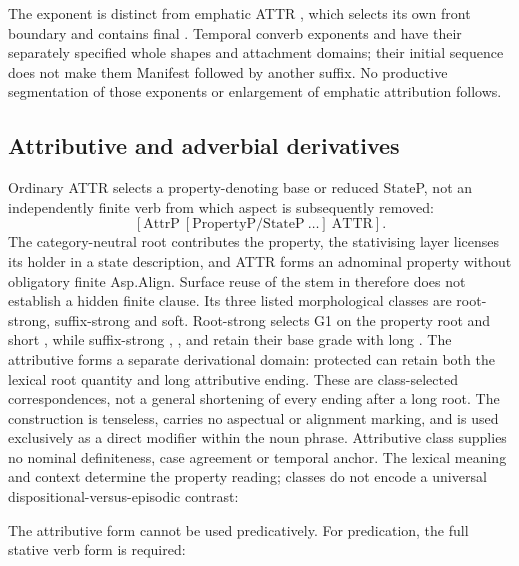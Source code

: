 The exponent is distinct from emphatic ATTR , which selects
its own front boundary and contains final . Temporal converb
exponents  and  have their separately specified
whole shapes and attachment domains; their initial sequence does not make
them Manifest followed by another suffix. No productive segmentation of
those exponents or enlargement of emphatic attribution follows.

\subsection{Attributive and adverbial derivatives}\label{sec:stative-attr}

Ordinary ATTR selects a property-denoting base or reduced StateP, not an
independently finite verb from which aspect is subsequently removed:
\[
[\mathrm{AttrP}\ [\mathrm{PropertyP}/\mathrm{StateP}\ \ldots]\ \mathrm{ATTR}].
\]
The category-neutral root contributes the property, the stativising layer
licenses its holder in a state description, and ATTR forms an adnominal
property without obligatory finite Asp.Align. Surface reuse of the stem in
 therefore does not establish a hidden finite clause. Its three
listed morphological classes are root-strong, suffix-strong and soft. Root-strong  selects G1 on the
property root and short , while suffix-strong ,
, and  retain their base grade with long
. The attributive forms a separate derivational domain: protected
 can retain both the lexical root quantity and long
attributive ending. These are class-selected correspondences, not a general
shortening of every ending after a long root. The construction is tenseless,
carries no aspectual or alignment marking, and is used exclusively as a
direct modifier within the noun phrase. Attributive class supplies no
nominal definiteness, case agreement or temporal anchor. The lexical meaning
and context determine the property reading; classes do not encode a universal
dispositional-versus-episodic contrast:

\pex
\a {} 
\a {} 
\a {} 
\xe

The attributive form cannot be used predicatively. For predication, the full
stative verb form is required:

\pex
\a {}  
\a {} 
\xe


